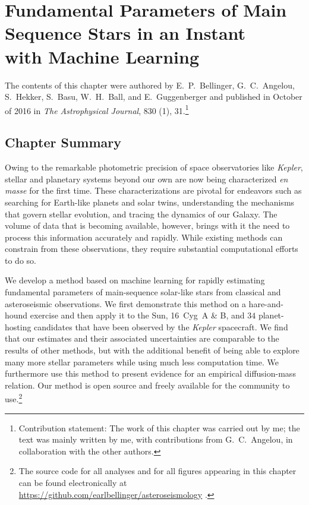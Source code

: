 \chapter{Fundamental Parameters of Main Sequence Stars in an Instant \\with Machine Learning}
\label{chap:ML} 

The contents of this chapter were authored by 
E.~P.~Bellinger, G.~C.~Angelou, S.~Hekker, S.~Basu, W.~H.~Ball, and E.~Guggenberger and published in October of 2016 in \emph{The Astrophysical Journal}, 830 (1), 31.\footnote{Contribution statement: The work of this chapter was carried out by me; the text was mainly written by me, with contributions from G.~C.~Angelou, in collaboration with the other authors.} 
\nocite{2016apj...830...31b}

\section*{Chapter Summary}
Owing to the remarkable photometric precision of space observatories like \emph{Kepler}, stellar and planetary systems beyond our own are now being characterized \emph{en masse} for the first time. These characterizations are pivotal for endeavors such as searching for Earth-like planets and solar twins, understanding the mechanisms that govern stellar evolution, and tracing the dynamics of our Galaxy. The volume of data that is becoming available, however, brings with it the need to process this information accurately and rapidly. While existing methods can constrain  from these observations, they require substantial computational efforts to do so. 

We develop a method based on machine learning for rapidly estimating fundamental parameters of main-sequence solar-like stars from classical and asteroseismic observations. We first demonstrate this method on a hare-and-hound exercise and then apply it to the Sun, 16~Cyg~A \& B, and $34$ planet-hosting candidates that have been observed by the \emph{Kepler} spacecraft. We find that our estimates and their associated uncertainties are comparable to the results of other methods, but with the additional benefit of being able to explore many more stellar parameters while using much less computation time. We furthermore use this method to present evidence for an empirical diffusion-mass relation. Our method is open source and freely available for the community to use.\footnote{The source code for all analyses and for all figures appearing in this chapter can be found electronically at \url{https://github.com/earlbellinger/asteroseismology} \citep{earl_bellinger_2016_55400}.}



